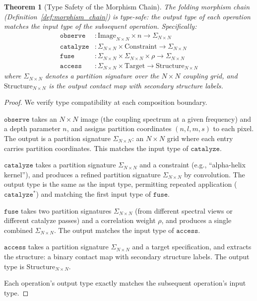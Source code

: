 \documentclass[11pt,twocolumn,a4paper]{article}
\newtheorem{theorem}{Theorem}[section]
\theoremstyle{definition}
\theoremstyle{remark}
\newcommand{\Sig}{\Sigma}
\begin{document}
\begin{theorem}[Type Safety of the Morphism Chain]
\label{thm:type_safety}
The folding morphism chain (Definition~\ref{def:morphism_chain}) is type-safe: the output type of each operation matches the input type of the subsequent operation. Specifically:
\begin{align}
\texttt{observe}&: \mathrm{Image}_{N \times N} \times n \to \Sig_{N \times N} \\
\texttt{catalyze}&: \Sig_{N \times N} \times \mathrm{Constraint} \to \Sig_{N \times N} \\
\texttt{fuse}&: \Sig_{N \times N} \times \Sig_{N \times N} \times \rho \to \Sig_{N \times N} \\
\texttt{access}&: \Sig_{N \times N} \times \mathrm{Target} \to \mathrm{Structure}_{N \times N}
\end{align}
where $\Sig_{N \times N}$ denotes a partition signature over the $N \times N$ coupling grid, and $\mathrm{Structure}_{N \times N}$ is the output contact map with secondary structure labels.
\end{theorem}

\begin{proof}
We verify type compatibility at each composition boundary.

$\texttt{observe}$ takes an $N \times N$ image (the coupling spectrum at a given frequency) and a depth parameter $n$, and assigns partition coordinates $(n, l, m, s)$ to each pixel. The output is a partition signature $\Sig_{N \times N}$: an $N \times N$ grid where each entry carries partition coordinates. This matches the input type of $\texttt{catalyze}$.

$\texttt{catalyze}$ takes a partition signature $\Sig_{N \times N}$ and a constraint (e.g., ``alpha-helix kernel''), and produces a refined partition signature $\Sig_{N \times N}$ by convolution. The output type is the same as the input type, permitting repeated application ($\texttt{catalyze}^*$) and matching the first input type of $\texttt{fuse}$.

$\texttt{fuse}$ takes two partition signatures $\Sig_{N \times N}$ (from different spectral views or different catalyze passes) and a correlation weight $\rho$, and produces a single combined $\Sig_{N \times N}$. The output matches the input type of $\texttt{access}$.

$\texttt{access}$ takes a partition signature $\Sig_{N \times N}$ and a target specification, and extracts the structure: a binary contact map with secondary structure labels. The output type is $\mathrm{Structure}_{N \times N}$.

Each operation's output type exactly matches the subsequent operation's input type.
\end{proof}
\end{document}
